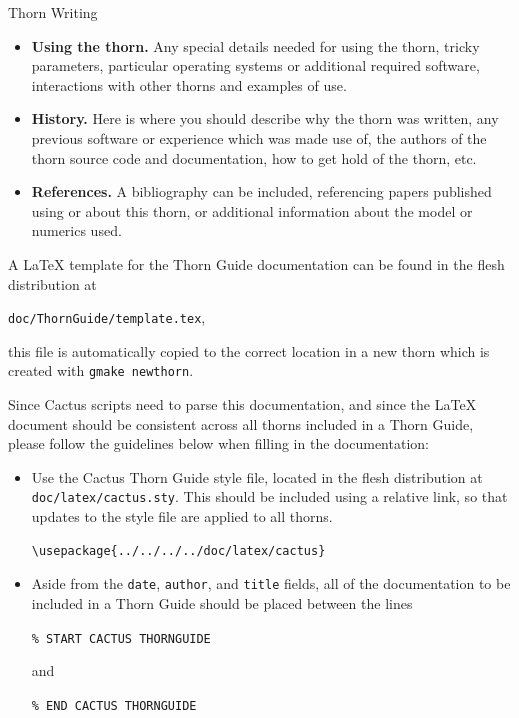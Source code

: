 \begin{cactuspart}{Thorn Writing}
\begin{itemize}
  \item{\bf Using the thorn.} Any special details needed for using the
    thorn, tricky parameters, particular operating systems or additional
    required software, interactions with other thorns and examples of use.

  \item{\bf History.} Here is where you should describe why the thorn
    was written, any previous software or experience which was made use of,
    the authors of the thorn source code and documentation, how to get
    hold of the thorn, etc.

  \item{\bf References.} A bibliography can be included, referencing papers
    published using or about this thorn, or additional information about
    the model or numerics used.

\end{itemize}

A LaTeX template for the Thorn Guide documentation can be found in the
flesh distribution at

\texttt{doc/ThornGuide/template.tex},

this file is automatically copied to the correct location in a new thorn
which is created with \texttt{gmake newthorn}.

Since Cactus scripts need to parse this documentation, and since the
LaTeX document should be consistent across all thorns included in a
Thorn Guide, please follow the guidelines below when filling in the
documentation:

\begin{itemize}

  \item Use the Cactus Thorn Guide style file, located in the flesh
    distribution at \texttt{doc/latex/cactus.sty}. This should be
    included using a relative link, so that updates to the style file
    are applied to all thorns.
%
\begin{verbatim}
\usepackage{../../../../doc/latex/cactus}
\end{verbatim}

  \item Aside from the \texttt{date}, \texttt{author}, and \texttt{title} fields,
    all of the documentation to be included in a Thorn Guide should be
    placed between the lines


 \texttt{\% START CACTUS THORNGUIDE}

and

 \texttt{\% END CACTUS THORNGUIDE}


\end{itemize}
\end{cactuspart}
